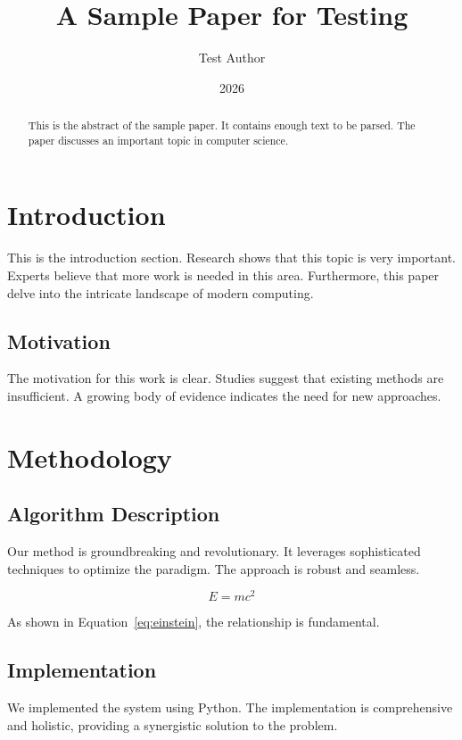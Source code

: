 \documentclass[12pt]{article}
\title{A Sample Paper for Testing}
\author{Test Author}
\date{2026}
\begin{document}
\maketitle

\begin{abstract}
This is the abstract of the sample paper. It contains enough text to be parsed.
The paper discusses an important topic in computer science.
\end{abstract}

\section{Introduction}

This is the introduction section. Research shows that this topic is very important.
Experts believe that more work is needed in this area. Furthermore, this paper
delve into the intricate landscape of modern computing.

\subsection{Motivation}

The motivation for this work is clear. Studies suggest that existing methods are
insufficient. A growing body of evidence indicates the need for new approaches.

\section{Methodology}

\subsection{Algorithm Description}

Our method is groundbreaking and revolutionary. It leverages sophisticated
techniques to optimize the paradigm. The approach is robust and seamless.

\begin{equation}
    E = mc^2
    \label{eq:einstein}
\end{equation}

As shown in Equation~\ref{eq:einstein}, the relationship is fundamental.

\subsection{Implementation}

We implemented the system using Python. The implementation is comprehensive
and holistic, providing a synergistic solution to the problem.
\end{document}
